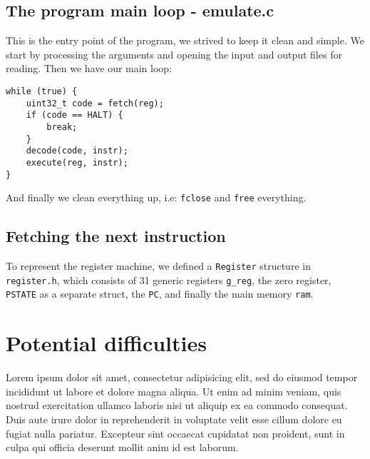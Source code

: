 \documentclass[11pt]{article}
\begin{document}
\subsection{The program main loop - emulate.c}
This is the entry point of the program, we strived to keep it clean and simple. 
We start by processing the arguments and opening the input and output files for
reading. Then we have our main loop:
\begin{verbatim}
while (true) {
    uint32_t code = fetch(reg);
    if (code == HALT) {
        break;
    }
    decode(code, instr);
    execute(reg, instr);
}
\end{verbatim}
And finally we clean everything up, i.e: \texttt{fclose} and \texttt{free}
everything.

\subsection{Fetching the next instruction}

To represent the register machine, we defined a \texttt{Register} structure in
\texttt{register.h}, which consists of 31 generic registers \texttt{g\_reg},
the zero register, \texttt{PSTATE} as a separate struct, the \texttt{PC}, and
finally the main memory \texttt{ram}.

\section{Potential difficulties}
Lorem ipsum dolor sit amet, consectetur adipisicing elit, sed do eiusmod tempor
incididunt ut labore et dolore magna aliqua. Ut enim ad minim veniam, quis
nostrud exercitation ullamco laboris nisi ut aliquip ex ea commodo consequat.
Duis aute irure dolor in reprehenderit in voluptate velit esse cillum dolore eu
fugiat nulla pariatur. Excepteur sint occaecat cupidatat non proident, sunt in
culpa qui officia deserunt mollit anim id est laborum.
\end{document}
